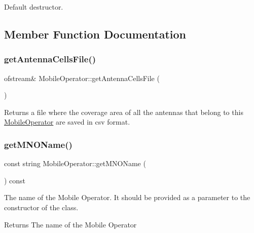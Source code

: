 Default destructor. 

\subsection{Member Function Documentation}
\mbox{\label{class_mobile_operator_ae6aa3043d946fa97eba7032b9707e52a}} 
\subsubsection{\texorpdfstring{getAntennaCellsFile()}{getAntennaCellsFile()}}
{\footnotesize\ttfamily ofstream\& Mobile\+Operator\+::get\+Antenna\+Cells\+File (\begin{DoxyParamCaption}{ }\end{DoxyParamCaption})}

\begin{DoxyReturn}{Returns}
a file where the coverage area of all the antennas that belong to this \mbox{\hyperlink{class_mobile_operator}{Mobile\+Operator}} are saved in csv format. 
\end{DoxyReturn}
\mbox{\label{class_mobile_operator_a003a5d91f543eaf5ff11894bd462ac77}} 
\subsubsection{\texorpdfstring{getMNOName()}{getMNOName()}}
{\footnotesize\ttfamily const string Mobile\+Operator\+::get\+M\+N\+O\+Name (\begin{DoxyParamCaption}{ }\end{DoxyParamCaption}) const}

The name of the Mobile Operator. It should be provided as a parameter to the constructor of the class. \begin{DoxyReturn}{Returns}
The name of the Mobile Operator 
\end{DoxyReturn}
\mbox{\label{class_mobile_operator_a2b4538d96f7aa898e6e470411d40cbf7}} 
